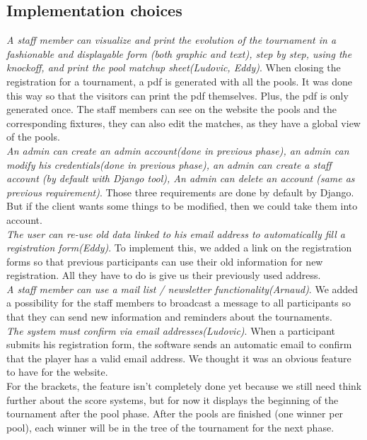 \documentclass[a4paper, 12pt]{article}
\begin{document}
\subsection*{Implementation choices}
\textit{A staff member can visualize and print the evolution of the tournament in a fashionable and displayable form (both graphic and text), step by step, using the knockoff, and print the pool matchup sheet(Ludovic, Eddy)}. When closing the registration for a tournament, a pdf is generated with all the pools. It was done this way so that the visitors can print the pdf themselves. Plus, the pdf is only generated once. The staff members can see on the website the pools and the corresponding fixtures, they can also edit the matches, as they have a global view of the pools. \\

\textit{An admin can create an admin account(done in previous phase), an admin can modify his credentials(done in previous phase), an admin can create a staff account (by default with Django tool), An admin can delete an account (same as previous requirement)}. Those three requirements are done by default by Django. But if the client wants some things to be modified, then we could take them into account. \\

\textit{The user can re-use old data linked to his email address to automatically fill a registration form(Eddy)}. To implement this, we added a link on the registration forms so that previous participants can use their old information for new registration. All they have to do is give us their previously used address.\\

\textit{A staff member can use a mail list / newsletter functionality(Arnaud)}. We added a possibility for the staff members to  broadcast a message to all participants so that they can send new information and reminders about the tournaments.\\

\textit{The system must confirm via email addresses(Ludovic)}. When a participant submits his registration form, the software sends an automatic email to confirm that the player has a valid email address. We thought it was an obvious feature to have for the website. \\

For the brackets, the feature isn't completely done yet because we still need think further about the score systems, but for now it displays the beginning of the tournament after the pool phase. After the pools are finished (one winner per pool), each winner will be in the tree of the tournament for the next phase. \\
\end{document}
